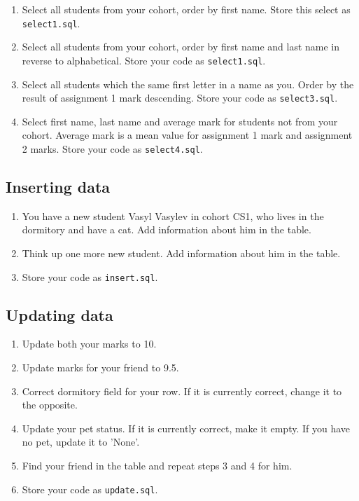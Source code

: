 \documentclass[12pt]{article}
\newcommand{\code}[1]{\texttt{#1}}
\begin{document}
\begin{enumerate}
\item Select all students from your cohort, order by first name. Store this select as \code{select1.sql}.

\item Select all students from your cohort, order by first name and last name  in reverse to alphabetical. Store your code as \code{select1.sql}.

\item Select all students which the same first letter in a name as you. Order by the result of assignment 1 mark descending. Store your code as \code{select3.sql}.

\item Select first name, last name and average mark for students not from your cohort. Average mark is a mean value for assignment 1 mark and assignment 2 marks. Store your code as \code{select4.sql}.

\end{enumerate}

\subsection*{Inserting data}

\begin{enumerate}

\item You have a new student Vasyl Vasylev in cohort CS1, who lives in the dormitory and have a cat. Add information about him in the table.

\item Think up one more new student. Add information about him in the table.

\item Store your code as \code{insert.sql}.

\end{enumerate}

\subsection*{Updating data}

\begin{enumerate}

\item Update both your marks to 10.

\item Update marks for your friend to 9.5.

\item Correct dormitory field for your row. If it is currently correct, change it to the opposite.

\item Update your pet status. If it is currently correct, make it empty. If you have no pet, update it to 'None'.

\item Find your friend in the table and repeat steps 3 and 4 for him.

\item Store your code as \code{update.sql}.

\end{enumerate}
\end{document}
